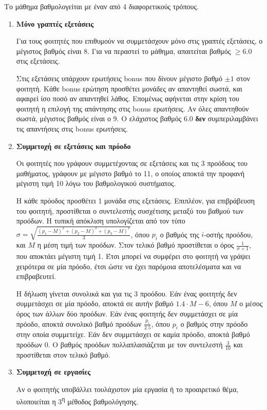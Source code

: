 \documentclass[11pt,a4paper,notitlepage,fleqn,final]{article}
\begin{document}
Το μάθημα βαθμολογείται με έναν από 4 διαφορετικούς τρόπους.
\begin{enumerate}
	\item \textbf{Μόνο γραπτές εξετάσεις}
	
	Για τους φοιτητές που επιθυμούν να συμμετάσχουν μόνο στις γραπτές εξετάσεις, ο μέγιστος βαθμός είναι 8. Για να περαστεί το μάθημα, απαιτείται βαθμός \( \geq 6.0 \) στις εξετάσεις. 
	
	Στις εξετάσεις υπάρχουν ερωτήσεις bonus που δίνουν μέγιστο βαθμό \( \pm 1 \) στον φοιτητή. Κάθε bonus ερώτηση προσθέτει μονάδες αν απαντηθεί σωστά, και αφαιρεί ίσο ποσό αν απαντηθεί λάθος. Επομένως αφήνεται στην κρίση του φοιτητή η επιλογή της απάντησης στις bonus ερωτήσεις. Αν όλες απαντηθούν σωστά, μέγιστος βαθμός είναι ο 9. Ο ελάχιστος βαθμός \( 6.0 \) \textbf{δεν} συμπεριλαμβάνει τις απαντήσεις στις bonus ερωτήσεις.
	\item \textbf{Συμμετοχή σε εξετάσεις και πρόοδο}
	
	Οι φοιτητές που γράφουν συμμετέχοντας σε εξετάσεις και τις 3 προόδους του μαθήματος, γράφουν με μέγιστο βαθμό το 11, ο οποίος
	αποκτά την προφανή μέγιστη τιμή 10 λόγω του βαθμολογικού συστήματος.
	
	Η κάθε πρόοδος προσθέτει 1 μονάδα στις εξετάσεις. Επιπλέον, για επιβράβευση του φοιτητή, προστίθεται ο συντελεστής συσχέτισης μεταξύ του βαθμού των προόδων. Η τυπική απόκλιση υπολογίζεται από τον τύπο \( \sigma = \sqrt{\frac{(p_1-M)^2+(p_2-M)^2+(p_3-M)^2}{3}} \), όπου \( p_i \) ο βαθμός της \(i\)-οστής προόδου, και \( M \) η μέση τιμή των προόδων. Στον τελικό βαθμό προστίθεται ο όρος \( \frac{1}{\sigma+1} \), που αποκτάει μέγιστη τιμή 1. Έτσι μπορεί να συμφέρει στο
	φοιτητή να γράψει χειρότερα σε μία πρόοδο, έτσι ώστε να έχει παρόμοια αποτελέσματα και να επιβραβευτεί.
	
	Η δήλωση γίνεται συνολικά και για τις 3 προόδου. Εάν ένας φοιτητής δεν συμμετάσχει σε μία πρόοδο, αποκτά σε αυτήν βαθμό \( 1.4\cdot M - 6 \), όπου \( M  \) ο μέσος όρος των άλλων δύο προόδων. Εάν ένας φοιτητής δεν συμμετάσχει σε μία πρόοδο, αποκτά
	συνολικό βαθμό προόδων \( \frac{p_i}{2.5} \), όπου \( p_i \) ο βαθμός στην πρόοδο στην οποία συμμετείχε. Εάν δεν συμμετάσχει
	σε καμία πρόοδο, αποκτά βαθμό προόδων 0. Ο βαθμός προόδων πολλαπλασιάζεται με τον συντελεστή \( \frac{3}{10} \) και προστίθεται στον τελικό βαθμό.
	\item \textbf{Συμμετοχή σε εργασίες}

	Αν ο φοιτητής υποβάλλει τουλάχιστον μία εργασία ή το προαιρετικό θέμα, υλοποιείται η 3\textsuperscript{η} μέθοδος βαθμολόγησης.
	

\end{enumerate}
\end{document}
